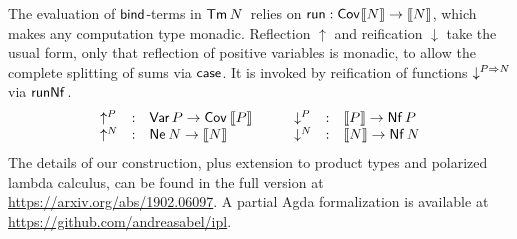 \documentclass[a4paper]{easychair}
\renewcommand{\patom}{\ensuremath{o}}
\begin{document}
The evaluation of $\tbind$-terms in $\Tm N$ relies on
$\trun : \Cov \den N \to \den N$, which makes any computation type
monadic.  Reflection $\uparrow$ and reification $\downarrow$ take the
usual form, only that reflection of positive variables is monadic, to
allow the complete splitting of sums via $\tcase$.
It is invoked by reification of functions $\down {P \To N}$ via $\trunNf$.
\[
\begin{array}[t]{lcl}
  \up P  & : & \tVar\, P \to \Cov\,\den P \\
  \up N & : & \tNe\,N \to \den N \\
\end{array}
\qquad
\begin{array}[t]{lcl}
  \down P & : & \den P \to \tVNf\,P \\
  \down N & : & \den N \to \tNf\,N \\
\end{array}
\]
The details of our construction, plus extension to product types and
polarized lambda calculus, can be found in the full version at
\url{https://arxiv.org/abs/1902.06097}.
A partial Agda formalization is available at
\url{https://github.com/andreasabel/ipl}.


\end{document}
